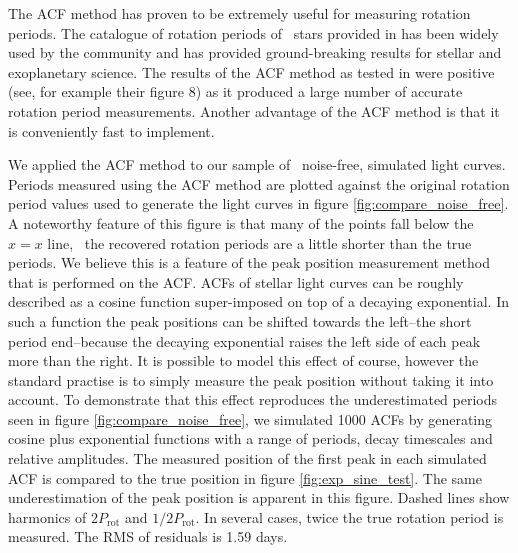 The ACF method has proven to be extremely useful for measuring rotation
periods.
The catalogue of rotation periods of \Kepler\ stars provided in
\citet{Mcquillan2013} has been widely used by the community and has provided
ground-breaking results for stellar and exoplanetary science.
The results of the ACF method as tested in \citet{Aigrain2015} were positive
(see, for example their figure 8) as it produced a large number of accurate
rotation period measurements.
Another advantage of the ACF method is that it is conveniently fast to
implement.

We applied the ACF method to our sample of \nlightcurves\ noise-free,
simulated light curves.
Periods measured using the ACF method are plotted against the original
rotation period values used to generate the light curves in figure
\ref{fig:compare_noise_free}.
A noteworthy feature of this figure is that many of the points fall below the
$x=x$ line, \ie\ the recovered rotation periods are a little shorter than the
true periods.
We believe this is a feature of the peak position measurement method that is
performed on the ACF.
ACFs of stellar light curves can be roughly described as a cosine function
super-imposed on top of a decaying exponential.
In such a function the peak positions can be shifted towards the left--the
short period end--because the decaying exponential raises the left side of
each peak more than the right.
It is possible to model this effect of course, however the standard practise
is to simply measure the peak position without taking it into account.
To demonstrate that this effect reproduces the underestimated periods seen in
figure \ref{fig:compare_noise_free}, we simulated 1000 ACFs by generating
cosine plus exponential functions with a range of periods, decay timescales
and relative amplitudes.
The measured position of the first peak in each simulated ACF is compared to
the true position in figure \ref{fig:exp_sine_test}.
The same underestimation of the peak position is apparent in this figure.
Dashed lines show harmonics of $2P_{\mathrm{rot}}$ and $1/2P_{\mathrm{rot}}$.
In several cases, twice the true rotation period is measured.
The RMS of residuals is 1.59 days.


